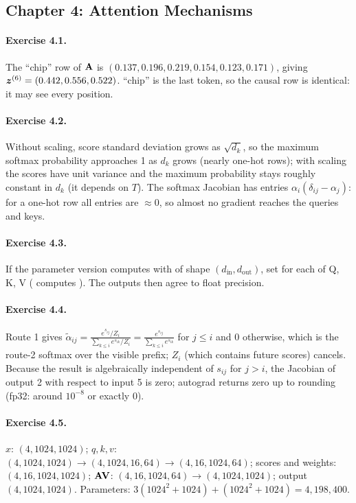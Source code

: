\subsection*{Chapter 4: Attention Mechanisms}

\paragraph{Exercise 4.1.} The ``chip'' row of $\mathbf{A}$ is $(0.137,0.196,0.219,0.154,0.123,0.171)$,
giving $\bm{z}^{(6)}=(0.442,0.556,0.522)$. ``chip'' is the last token, so the causal row is identical:
it may see every position.

\paragraph{Exercise 4.2.} Without scaling, score standard deviation grows as $\sqrt{d_k}$, so the
maximum softmax probability approaches 1 as $d_k$ grows (nearly one-hot rows); with scaling the
scores have unit variance and the maximum probability stays roughly constant in $d_k$ (it depends on
$T$). The softmax Jacobian has entries $\alpha_i(\delta_{ij}-\alpha_j)$: for a one-hot row all entries
are $\approx0$, so almost no gradient reaches the queries and keys.

\paragraph{Exercise 4.3.} If the parameter version computes  with  of shape
$(d_{\text{in}},d_{\text{out}})$, set  for each of Q, K, V
( computes ). The outputs then agree to float precision.

\paragraph{Exercise 4.4.} Route 1 gives $\tilde\alpha_{ij}=\frac{e^{s_{ij}}/Z_i}{\sum_{k\le i}e^{s_{ik}}/Z_i}=\frac{e^{s_{ij}}}{\sum_{k\le i}e^{s_{ik}}}$
for $j\le i$ and 0 otherwise, which is the route-2 softmax over the visible prefix; $Z_i$ (which
contains future scores) cancels. Because the result is algebraically independent of
$s_{ij}$ for $j>i$, the Jacobian of output 2 with respect to input 5 is zero; autograd returns zero up to
rounding (fp32: around $10^{-8}$ or exactly 0).

\paragraph{Exercise 4.5.} $x$: $(4,1024,1024)$; $q,k,v$: $(4,1024,1024)\to(4,1024,16,64)\to(4,16,1024,64)$;
scores and weights: $(4,16,1024,1024)$; $\mathbf{A}\mathbf{V}$: $(4,16,1024,64)\to(4,1024,1024)$; output
$(4,1024,1024)$. Parameters: $3(1024^2+1024)+(1024^2+1024)=4{,}198{,}400$.

